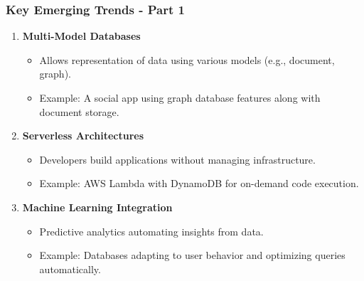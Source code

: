 \documentclass[aspectratio=169]{beamer}
\begin{document}
\begin{frame}[fragile]
    \frametitle{Key Emerging Trends - Part 1}
    \begin{enumerate}
        \item \textbf{Multi-Model Databases}
        \begin{itemize}
            \item Allows representation of data using various models (e.g., document, graph).
            \item Example: A social app using graph database features along with document storage.
        \end{itemize}

        \item \textbf{Serverless Architectures}
        \begin{itemize}
            \item Developers build applications without managing infrastructure.
            \item Example: AWS Lambda with DynamoDB for on-demand code execution.
        \end{itemize}

        \item \textbf{Machine Learning Integration}
        \begin{itemize}
            \item Predictive analytics automating insights from data.
            \item Example: Databases adapting to user behavior and optimizing queries automatically.
        \end{itemize}
    \end{enumerate}
\end{frame}
\end{document}
